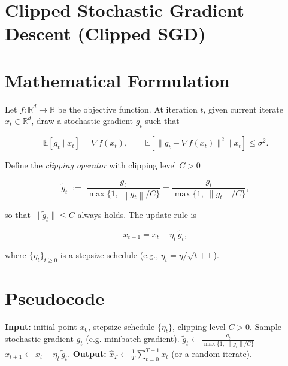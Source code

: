 \documentclass{article}
\newcommand{\E}{\mathbb{E}}
\newcommand{\R}{\mathbb{R}}
\newcommand{\norm}[1]{\left\|#1\right\|}
\newcommand{\clip}[2]{\frac{#1}{\max\{1,\; \norm{#1}/#2\}}}
\begin{document}
\section*{Clipped Stochastic Gradient Descent (Clipped SGD)}

\section*{Mathematical Formulation}
Let $f:\R^{d}\rightarrow\R$ be the objective function.  
At iteration $t$, given current iterate $x_t\in\R^{d}$, draw a stochastic gradient $g_t$ such that  

\[
\E\!\left[g_t\mid x_t\right]=\nabla f(x_t),\qquad 
\E\!\left[\|g_t-\nabla f(x_t)\|^{2}\mid x_t\right]\le\sigma^{2}.
\]

Define the \emph{clipping operator} with clipping level $C>0$  

\[
\tilde g_t \;:=\; \clip{g_t}{C}
      =\frac{g_t}{\max\bigl\{1,\;\|g_t\|/C\bigr\}},
\tag{1}
\]

so that $\|\tilde g_t\|\le C$ always holds.  
The update rule is  

\[
x_{t+1}=x_t-\eta_t\,\tilde g_t,
\tag{2}
\]

where $\{\eta_t\}_{t\ge0}$ is a stepsize schedule (e.g., $\eta_t=\eta/\sqrt{t+1}$).

\section*{Pseudocode}
\begin{algorithm}[H]
\caption{Clipped SGD}
\begin{algorithmic}[1]
\STATE \textbf{Input:} initial point $x_0$, stepsize schedule $\{\eta_t\}$, clipping level $C>0$.
    \STATE Sample stochastic gradient $g_t$ (e.g. minibatch gradient).
    \STATE $\displaystyle \tilde g_t\gets\frac{g_t}{\max\{1,\;\|g_t\|/C\}}$ \hfill{}
    \STATE $x_{t+1}\gets x_t-\eta_t\,\tilde g_t$.
\ENDFOR
\STATE \textbf{Output:} $\displaystyle \hat x_T\gets\frac{1}{T}\sum_{t=0}^{T-1}x_t$ (or a random iterate).
\end{algorithmic}
\end{algorithm}
\end{document}

